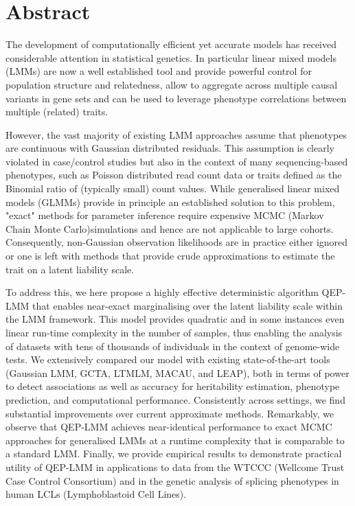 \section{Abstract}

The development of computationally efficient yet accurate models has received
considerable attention in statistical genetics. In particular linear mixed
models (LMMs) are now a well established tool and provide powerful control for
population structure and relatedness, allow to aggregate across multiple causal
variants in gene sets and can be used to leverage phenotype correlations between
multiple (related) traits.

However, the vast majority of existing LMM approaches assume that phenotypes
are continuous with Gaussian distributed residuals. This assumption is clearly
violated in case/control studies but also in the context of many
sequencing-based phenotypes, such as Poisson distributed read count data or
traits defined as the Binomial ratio of (typically small) count values. While
generalised linear mixed models (GLMMs) provide in principle an established
solution to this problem, "exact" methods for parameter inference require
expensive MCMC (Markov Chain Monte Carlo)simulations and hence are not applicable
to large cohorts. Consequently, non-Gaussian observation likelihoods are in
practice either ignored or one is left with methods that provide crude
approximations to estimate the trait on a latent liability scale.

To address this, we here propose a highly effective deterministic algorithm
QEP-LMM that enables near-exact marginalising over the latent liability scale
within the LMM framework. This model provides quadratic and in some instances
even linear run-time complexity in the number of samples, thus enabling the
analysis of datasets with tens of thousands of individuals in the context of
genome-wide tests. We extensively compared our model with existing
state-of-the-art tools (Gaussian LMM, GCTA, LTMLM, MACAU, and LEAP), both in
terms of power to detect associations as well as accuracy for heritability
estimation, phenotype prediction, and computational performance. Consistently
across settings, we find substantial improvements over current approximate
methods. Remarkably, we observe that QEP-LMM achieves near-identical performance
to exact MCMC approaches for generalised LMMs at a runtime complexity that is
comparable to a standard LMM. Finally, we provide empirical results to
demonstrate practical utility of QEP-LMM in applications to data from the WTCCC
(Wellcome Trust Case Control Consortium) and in the genetic analysis of splicing
phenotypes in human LCLs (Lymphoblastoid Cell Lines).

